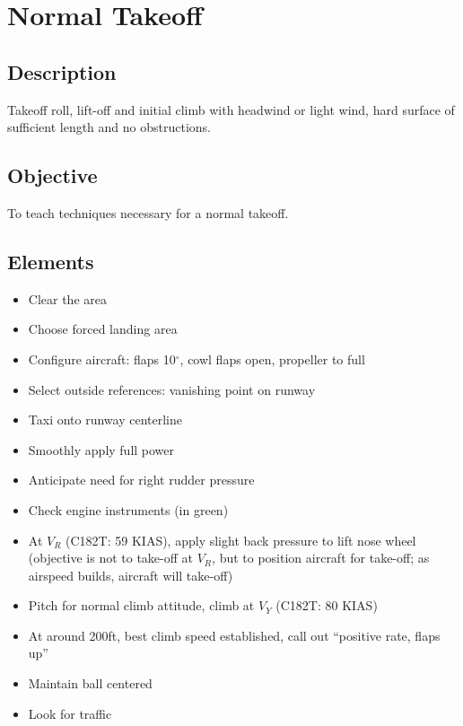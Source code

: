 \section{Normal Takeoff}

\subsection{Description}

Takeoff roll, lift-off and initial climb with headwind or light wind, hard
surface of sufficient length and no obstructions.

\subsection{Objective}

To teach techniques necessary for a normal takeoff.

\subsection{Elements}

\begin{itemize}
  \item Clear the area
  \item Choose forced landing area
  \item Configure aircraft: flaps 10$^\circ$, cowl flaps open, propeller to
    full
  \item Select outside references: vanishing point on runway
  \item Taxi onto runway centerline
  \item Smoothly apply full power
  \item Anticipate need for right rudder pressure
  \item Check engine instruments (in green)
  \item At $V_R$ (C182T: 59 KIAS), apply slight back pressure to lift nose
    wheel (objective is not to take-off at $V_R$, but to position aircraft for
    take-off; as airspeed builds, aircraft will take-off)
  \item Pitch for normal climb attitude, climb at $V_Y$ (C182T: 80 KIAS)
  \item At around 200ft, best climb speed established, call out ``positive
    rate, flaps up''
  \item Maintain ball centered 
  \item Look for traffic
\end{itemize}

